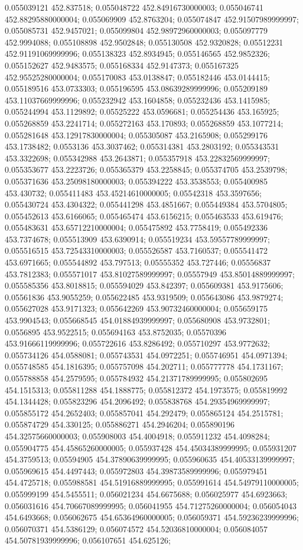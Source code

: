 0.055039121 452.837518; 0.055048722 452.84916730000003; 0.055046741 452.88295880000004; 0.055069909 452.8763204; 0.055074847 452.91507989999997; 0.055085731 452.9457021; 0.055099804 452.98972960000003; 0.055097779 452.9994088; 0.055108898 452.9502848; 0.055130508 452.9320828; 0.05512231 452.91191069999996; 0.055138323 452.8934945; 0.055146565 452.9852326; 0.055152627 452.9483575; 0.055168334 452.9147373; 0.055167325 452.95525280000004; 0.055170083 453.0138847; 0.055182446 453.0144415; 0.055189516 453.0733303; 0.055196595 453.08639289999996; 0.055209189 453.11037669999996; 0.055232942 453.1604858; 0.055232436 453.1415985; 0.055244994 453.1129892; 0.05525222 453.0596681; 0.055254436 453.165925; 0.055268859 453.2241714; 0.055272163 453.170893; 0.055268859 453.1077214; 0.055281648 453.12917830000004; 0.055305087 453.2165908; 0.055299176 453.1738482; 0.0553136 453.3037462; 0.055314381 453.2803192; 0.055343531 453.3322698; 0.055342988 453.2643871; 0.055357918 453.22832569999997; 0.055353677 453.2223726; 0.055365379 453.2258845; 0.055374705 453.2539798; 0.055371636 453.25098180000003; 0.055394222 453.3538553; 0.055400985 453.430732; 0.055411483 453.45214610000005; 0.05542318 453.3597656; 0.055430724 453.4304322; 0.055441298 453.4851667; 0.055449384 453.5704805; 0.055452613 453.6166065; 0.055465474 453.6156215; 0.055463533 453.619476; 0.055483631 453.65712210000004; 0.055475892 453.7758419; 0.055492336 453.7374678; 0.055513909 453.6390914; 0.055519234 453.59557789999997; 0.055516515 453.72543310000003; 0.055526587 453.7160537; 0.055541472 453.6971665; 0.055544892 453.797513; 0.05555352 453.727446; 0.05556837 453.7812383; 0.055571017 453.81027589999997; 0.05557949 453.85014889999997; 0.055585356 453.8018815; 0.055594029 453.842397; 0.055609381 453.9175606; 0.05561836 453.9055259; 0.055622485 453.9319509; 0.055643086 453.9879274; 0.055627028 453.9171323; 0.055642269 453.90732460000004; 0.055659175 453.9904543; 0.055668545 454.01884939999997; 0.055680908 453.9732801; 0.0556895 453.9522515; 0.055694163 453.8752035; 0.05570396 453.91666119999996; 0.055722616 453.8286492; 0.055710297 453.9772632; 0.055734126 454.0588081; 0.055743531 454.0972251; 0.055746951 454.0971394; 0.055748585 454.1816395; 0.055757098 454.202711; 0.055777778 454.1731167; 0.055788858 454.2579595; 0.055784932 454.21371789999995; 0.055802695 454.1515313; 0.055811288 454.1888775; 0.055812372 454.1973575; 0.055819992 454.1344428; 0.055823296 454.2096492; 0.055838768 454.29354969999997; 0.055855172 454.2652403; 0.055857041 454.292479; 0.055865124 454.2515781; 0.055874729 454.330125; 0.055886271 454.2946204; 0.055890196 454.32575660000003; 0.055908003 454.4004918; 0.055911232 454.4098284; 0.055904775 454.45865260000005; 0.055937428 454.45034389999995; 0.055931207 454.3759513; 0.05594905 454.37890639999995; 0.055960635 454.40533139999997; 0.055969615 454.4497443; 0.055972803 454.39873589999996; 0.055979451 454.4725718; 0.055988581 454.51916889999995; 0.055991614 454.54979110000005; 0.055999199 454.5455511; 0.056021234 454.6675688; 0.056025977 454.6923663; 0.056031616 454.70667089999995; 0.056041955 454.71275260000004; 0.056054043 454.6493668; 0.056062675 454.65364960000005; 0.056059371 454.59236239999996; 0.056070371 454.5386129; 0.056074572 454.52036810000004; 0.056084057 454.50781939999996; 0.056107651 454.625126; 